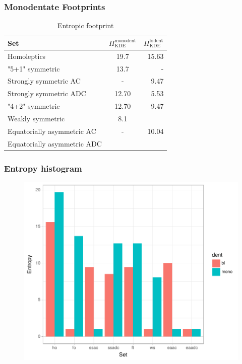 \documentclass[xcolor=dvipsnames]{beamer}
\begin{document}
\begin{frame}
\begin{figure}[ht]
\begin{minipage}[b]{0.5\linewidth}
		\vspace{2ex}
	\end{minipage} 
\end{figure}
\end{frame}

\begin{frame}
\frametitle{Monodentate Footprints}
	\begin{table}[]
	\centering
	\caption{Entropic footprint}
	\label{tab:ent-footprint}
	\begin{tabular}{lcr}
		\toprule
		Set 					    &  $H_{\textrm{KDE}}^{\textrm{monodent}}$   & $H_{\textrm{KDE}}^{\textrm{bident}}$ \\
		\midrule
		Homoleptics                 &  19.7  & 15.63   \\[0.1cm]
		"5+1" symmetric             &  13.7  & -       \\[0.1cm]
		Strongly symmetric AC       &  -     & 9.47    \\[0.1cm]
		Strongly symmetric ADC      &  12.70 & 5.53    \\[0.1cm]
		"4+2" symmetric             &  12.70 & 9.47    \\[0.1cm] 
		Weakly symmetric            &  8.1   &         \\[0.1cm]
		Equatorially asymmetric AC  &  -     & 10.04   \\[0.1cm]
		Equatorially asymmetric ADC &        &         \\[0.1cm]

		\bottomrule
	\end{tabular}
	\end{table}
\end{frame}

\begin{frame}
\frametitle{Entropy histogram}
\begin{figure}
\includegraphics[width=0.7\linewidth]{img/ent.pdf}
\end{figure}
\end{frame}
\end{document}

